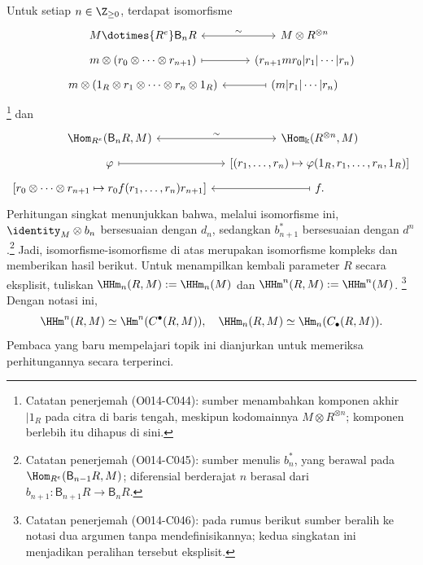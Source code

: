 Untuk setiap $n\in\Z_{\geq0}$, terdapat isomorfisme
\[\begin{tikzcd}[row sep=tiny]
	M \dotimes{R^e} \mathsf{B}_n R \arrow[leftrightarrow, r, "\sim"]
	& M \otimes R^{\otimes n} \\
	m \otimes (r_0 \otimes \cdots \otimes r_{n+1}) \arrow[mapsto, r]
	& (r_{n+1} m r_0 | r_1 | \cdots | r_n) \\
	m \otimes (1_R \otimes r_1 \otimes \cdots \otimes r_n \otimes 1_R )
	& (m | r_1 | \cdots | r_n) \arrow[mapsto, l]
\end{tikzcd}\]
\footnote{Catatan penerjemah (O014-C044): sumber menambahkan komponen akhir
$|1_R$ pada
citra di baris tengah, meskipun kodomainnya $M\otimes R^{\otimes n}$; komponen
berlebih itu dihapus di sini.}
dan
\[\begin{tikzcd}[row sep=tiny, column sep=small]
	\Hom_{R^e}(\mathsf{B}_nR, M) \arrow[leftrightarrow, r, "\sim"]
	& \Hom_{\Bbbk}(R^{\otimes n}, M) \\
	\varphi \arrow[mapsto, r]
	& {\left[(r_1,\ldots,r_n)\mapsto
		\varphi(1_R,r_1,\ldots,r_n,1_R)\right]} \\
	{\left[r_0\otimes\cdots\otimes r_{n+1}\mapsto
		r_0f(r_1,\ldots,r_n)r_{n+1}\right]}
	& f \arrow[mapsto, l] .
\end{tikzcd}\]
Perhitungan singkat menunjukkan bahwa, melalui isomorfisme ini,
$\identity_M\otimes b_n$ bersesuaian dengan $d_n$, sedangkan $b_{n+1}^*$
bersesuaian dengan $d^n$.\footnote{Catatan penerjemah (O014-C045): sumber menulis
$b_n^*$, yang berawal pada $\Hom_{R^e}(\mathsf{B}_{n-1}R,M)$; diferensial
berderajat $n$ berasal dari $b_{n+1}:\mathsf{B}_{n+1}R\to\mathsf{B}_nR$.}
Jadi, isomorfisme-isomorfisme di atas merupakan isomorfisme kompleks dan
memberikan hasil berikut. Untuk menampilkan kembali parameter $R$ secara
eksplisit, tuliskan
$\HHm_n(R,M):=\HHm_n(M)$ dan $\HHm^n(R,M):=\HHm^n(M)$.
\footnote{Catatan penerjemah (O014-C046): pada rumus berikut sumber beralih ke notasi
dua argumen tanpa mendefinisikannya; kedua singkatan ini menjadikan peralihan
tersebut eksplisit.} Dengan notasi ini,
\[ \HHm^n(R, M) \simeq \Hm^n(C^\bullet(R, M)), \quad
	\HHm_n(R, M) \simeq \Hm_n(C_\bullet(R, M)). \]
Pembaca yang baru mempelajari topik ini dianjurkan untuk memeriksa
perhitungannya secara terperinci.


